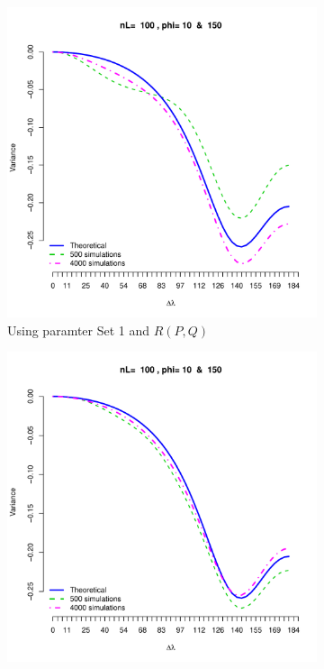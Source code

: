 \begin{figure}[H]
	\begin{subfigure}{.5\textwidth}
		\centering
		\includegraphics[width=1\linewidth]{graphs/results_variogram_model1_rpq}
		\caption{Using paramter Set 1 and $R(P,Q)$}
		\label{fig:sfig1}
	\end{subfigure}
	\begin{subfigure}{.5\textwidth}
		\centering
		\includegraphics[width=1\linewidth]{graphs/results_variogram_model1}

\end{subfigure}
\end{figure}
